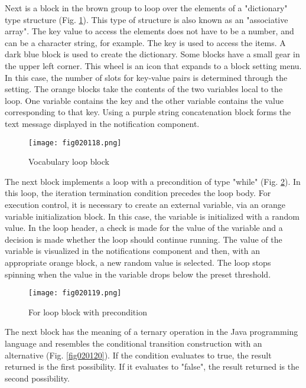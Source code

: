Next is a block in the brown group to loop over the elements of a "dictionary" type structure (Fig. \ref{fig020118}). This type of structure is also known as an "associative array". The key value to access the elements does not have to be a number, and can be a character string, for example. The key is used to access the items. A dark blue block is used to create the dictionary. Some blocks have a small gear in the upper left corner. This wheel is an icon that expands to a block setting menu. In this case, the number of slots for key-value pairs is determined through the setting. The orange blocks take the contents of the two variables local to the loop. One variable contains the key and the other variable contains the value corresponding to that key. Using a purple string concatenation block forms the text message displayed in the notification component.

\begin{figure}[H]
   \centering
   \texttt{[image: fig020118.png]}
   \caption{Vocabulary loop block}
\label{fig020118}
\end{figure}

The next block implements a loop with a precondition of type "while" (Fig. \ref{fig020119}). In this loop, the iteration termination condition precedes the loop body. For execution control, it is necessary to create an external variable, via an orange variable initialization block. In this case, the variable is initialized with a random value. In the loop header, a check is made for the value of the variable and a decision is made whether the loop should continue running. The value of the variable is visualized in the notifications component and then, with an appropriate orange block, a new random value is selected. The loop stops spinning when the value in the variable drops below the preset threshold.

\begin{figure}[H]
   \centering
   \texttt{[image: fig020119.png]}
   \caption{For loop block with precondition}
\label{fig020119}
\end{figure}

The next block has the meaning of a ternary operation in the Java programming language and resembles the conditional transition construction with an alternative (Fig. \ref{fig020120}). If the condition evaluates to true, the result returned is the first possibility. If it evaluates to "false", the result returned is the second possibility.

